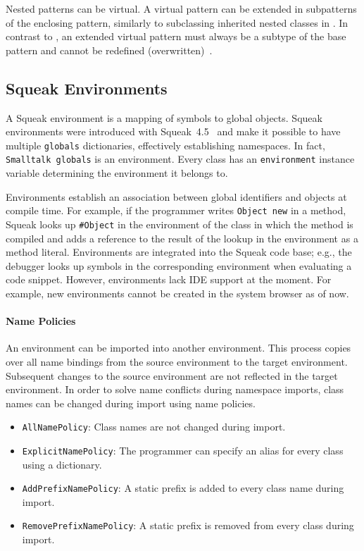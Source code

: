 Nested patterns can be virtual. A virtual pattern can be extended in subpatterns of the enclosing pattern, similarly to subclassing inherited nested classes in \msname. In contrast to \msname, an extended virtual pattern must always be a subtype of the base pattern and cannot be redefined (overwritten)~\cite{madsen1993overview}.

\subsection{Squeak Environments}
\label{sec:rel_sq_env}
A Squeak environment is a mapping of symbols to global objects. Squeak environments were introduced with Squeak~4.5~\cite{squeak45notes} and make it possible to have multiple \texttt{globals} dictionaries, effectively establishing namespaces. In fact, \texttt{Smalltalk globals} is an environment. Every class has an \texttt{environment} instance variable determining the environment it belongs to.

Environments establish an association between global identifiers and objects at compile time. For example, if the programmer writes \texttt{Object new} in a method, Squeak looks up \texttt{\#Object} in the environment of the class in which the method is compiled and adds a reference to the result of the lookup in the environment as a method literal. Environments are integrated into the Squeak code base; e.g., the debugger looks up symbols in the corresponding environment when evaluating a code snippet. However, environments lack IDE support at the moment. For example, new environments cannot be created in the system browser as of now.

\paragraph{Name Policies}
An environment can be imported into another environment. This process copies over all name bindings from the source environment to the target environment. Subsequent changes to the source environment are not reflected in the target environment. In order to solve name conflicts during namespace imports, class names can be changed during import using name policies.

\begin{itemize}
    \item \texttt{AllNamePolicy}: Class names are not changed during import.
    \item \texttt{ExplicitNamePolicy}: The programmer can specify an alias for every class using a dictionary.
    \item \texttt{AddPrefixNamePolicy}: A static prefix is added to every class name during import.
    \item \texttt{RemovePrefixNamePolicy}: A static prefix is removed from every class during import.
\end{itemize}

